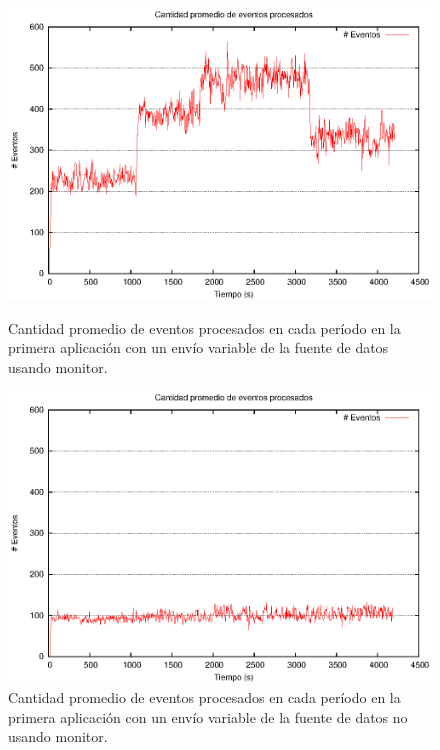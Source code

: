 \begin{figure}[!ht]
\centering

\begin{minipage}[c]{0.45\textwidth}
\centering
    \includegraphics[width=\textwidth]{images/exp/app1/normal/cm/avgEventProcess.eps}
    \caption{Cantidad promedio de eventos procesados en cada período en la primera aplicación con un envío variable de la fuente de datos usando monitor.}
    \label{fig:app1-normal-cm-avgEventProcess}
\end{minipage}
\hspace*{1cm}
\begin{minipage}[c]{0.45\textwidth}
\centering
    \includegraphics[width=\textwidth]{images/exp/app1/normal/sm/avgEventProcess.eps}
    \caption{Cantidad promedio de eventos procesados en cada período en la primera aplicación con un envío variable de la fuente de datos no usando monitor.}
    \label{fig:app1-normal-sm-avgEventProcess}
\end{minipage}

\end{figure}


